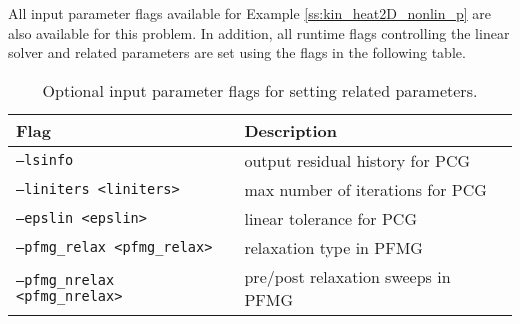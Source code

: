 All input parameter flags available for Example \ref{ss:kin_heat2D_nonlin_p} are
also available for this problem.  In addition, all runtime flags controlling the
linear solver and {\hypre} related parameters are set using the flags in the
following table.
\begin{center}
\begin{table}
\caption{Optional input parameter flags for setting {\hypre} related parameters.}
\begin{tabular}{ |p{6cm}|p{10cm}| }
\hline
Flag & Description \\
\hline
{\tt --lsinfo} & output residual history for PCG\\
{\tt --liniters <liniters>} & max number of iterations for PCG\\
{\tt --epslin <epslin>} & linear tolerance for PCG\\
{\tt --pfmg\_relax <pfmg\_relax>} & relaxation type in PFMG\\
{\tt --pfmg\_nrelax <pfmg\_nrelax>} & pre/post relaxation sweeps in PFMG\\
\hline
\end{tabular}
\end{table}
\end{center}
